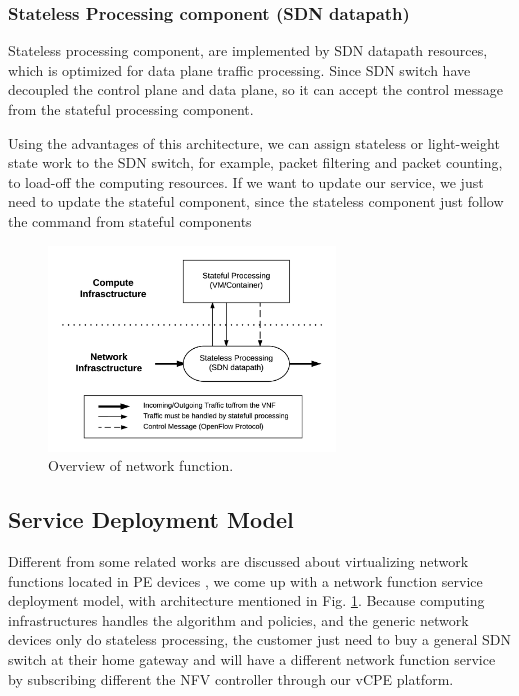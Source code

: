 \documentclass[journal]{IEEEtran}
\begin{document}
\subsubsection{Stateless Processing component (SDN datapath)}
Stateless processing component, are implemented by SDN datapath resources, which is optimized for data plane traffic processing. Since SDN switch have decoupled the control plane and data plane, so it can accept the control message from the stateful processing component.

Using the advantages of this architecture, we can assign stateless or light-weight state work to the SDN switch, for example, packet filtering and packet counting, to load-off the computing resources. If we want to update our service, we just need to update the stateful component, since the stateless component just follow the command from stateful components

\begin{figure}[!t]
\centering
\includegraphics[width=3in]{./figures/desc_nfv_overview}
\caption{Overview of network function.}
\label{fig:desc_nfv_overview}
\end{figure}



\subsection{Service Deployment Model}
Different from some related works are discussed about virtualizing network functions located in PE devices \cite{vcpe-enhance}, we come up with a network function service deployment model, with architecture mentioned in Fig. \ref{fig:desc_nfv_overview}. Because computing infrastructures handles the algorithm and policies, and the generic network devices only do stateless processing, the customer just need to buy a general SDN switch at their home gateway and will have a different network function service by subscribing different the NFV controller through our vCPE platform.
\end{document}
